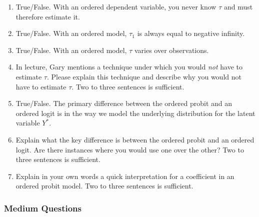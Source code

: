 \documentclass[11pt]{article}
\begin{document}
\begin{enumerate}
\item True/False. With an ordered dependent variable, you never know $\tau$ and must therefore estimate it. 
\item True/False. With an ordered model, $\tau_1$ is always equal to negative infinity. 
\item True/False. With an ordered model, $\tau$ varies over observations. 
\item In lecture, Gary mentions a technique under which you would \emph{not} have to estimate $\tau$.  Please explain this technique and describe why you would not have to estimate $\tau$. Two to three sentences is sufficient. 
\item True/False. The primary difference between the ordered probit and an ordered logit is in the way we model the underlying distribution for the latent variable $Y^*$. 
\item Explain what the key difference is between the ordered probit and an ordered logit. Are there instances where you would use one over the other? Two to three sentences is sufficient. 
\item Explain in your own words a quick interpretation for a coefficient in an ordered probit model. Two to three sentences is sufficient. 
\end{enumerate}

\subsubsection{Medium Questions}
\end{document}

